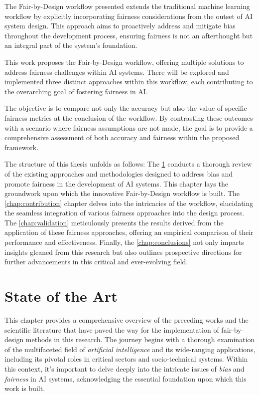 \documentclass[12pt,a4paper,openright,twoside]{book}
\begin{document}
The Fair-by-Design workflow presented extends the traditional machine learning workflow by explicitly incorporating fairness considerations from the outset of AI system design. This approach aims to proactively address and mitigate bias throughout the development process, ensuring fairness is not an afterthought but an integral part of the system's foundation.

This work proposes the Fair-by-Design workflow, offering multiple solutions to address fairness challenges within AI systems. There will be explored and implemented three distinct approaches within this workflow, each contributing to the overarching goal of fostering fairness in AI.

The objective is to compare not only the accuracy but also the value of specific fairness metrics at the conclusion of the workflow. By contrasting these outcomes with a scenario where fairness assumptions are not made, the goal is to provide a comprehensive assessment of both accuracy and fairness within the proposed framework.

The structure of this thesis unfolds as follows: The \cref{chap:background} conducts a thorough review of the existing approaches and methodologies designed to address bias and promote fairness in the development of AI systems. This chapter lays the groundwork upon which the innovative Fair-by-Design workflow is built. The \cref{chap:contribution} chapter delves into the intricacies of the workflow, elucidating the seamless integration of various fairness approaches into the design process. The \cref{chap:validation} meticulously presents the results derived from the application of these fairness approaches, offering an empirical comparison of their performance and effectiveness. Finally, the \cref{chap:conclusions} not only imparts insights gleaned from this research but also outlines prospective directions for further advancements in this critical and ever-evolving field.

\chapter{State of the Art} %
\label{chap:background}

This chapter provides a comprehensive overview of the preceding works and the scientific literature that have paved the way for the implementation of fair-by-design methods in this research. The journey begins with a thorough examination of the multifaceted field of \emph{artificial intelligence} and its wide-ranging applications, including its pivotal roles in critical sectors and socio-technical systems. Within this context, it's important to delve deeply into the intricate issues of \emph{bias} and \emph{fairness} in AI systems, acknowledging the essential foundation upon which this work is built. 
\end{document}
